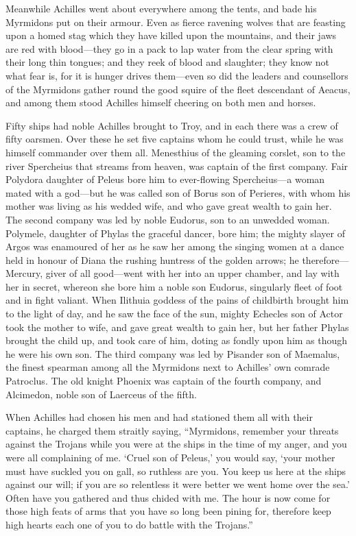 Meanwhile Achilles went about everywhere among the tents, and bade his
Myrmidons put on their armour. Even as fierce ravening wolves that are
feasting upon a homed stag which they have killed upon the mountains, and
their jaws are red with blood—they go in a pack to lap water from
the clear spring with their long thin tongues; and they reek of blood and
slaughter; they know not what fear is, for it is hunger drives them—even
so did the leaders and counsellors of the Myrmidons gather round the good
squire of the fleet descendant of Aeacus, and among them stood Achilles
himself cheering on both men and horses.

Fifty ships had noble Achilles brought to Troy, and in each there was a
crew of fifty oarsmen. Over these he set five captains whom he could
trust, while he was himself commander over them all. Menesthius of the
gleaming corslet, son to the river Spercheius that streams from heaven,
was captain of the first company. Fair Polydora daughter of Peleus bore
him to ever-flowing Spercheius—a woman mated with a god—but he
was called son of Borus son of Perieres, with whom his mother was living
as his wedded wife, and who gave great wealth to gain her. The second
company was led by noble Eudorus, son to an unwedded woman. Polymele,
daughter of Phylas the graceful dancer, bore him; the mighty slayer of
Argos was enamoured of her as he saw her among the singing women at a
dance held in honour of Diana the rushing huntress of the golden arrows;
he therefore—Mercury, giver of all good—went with her into an
upper chamber, and lay with her in secret, whereon she bore him a noble
son Eudorus, singularly fleet of foot and in fight valiant. When Ilithuia
goddess of the pains of childbirth brought him to the light of day, and
he saw the face of the sun, mighty Echecles son of Actor took the mother
to wife, and gave great wealth to gain her, but her father Phylas brought
the child up, and took care of him, doting as fondly upon him as though he
were his own son. The third company was led by Pisander son of Maemalus,
the finest spearman among all the Myrmidons next to Achilles’ own comrade
Patroclus. The old knight Phoenix was captain of the fourth company, and
Alcimedon, noble son of Laerceus of the fifth.

When Achilles had chosen his men and had stationed them all with their
captains, he charged them straitly saying, “Myrmidons, remember your
threats against the Trojans while you were at the ships in the time of my
anger, and you were all complaining of me. ‘Cruel son of Peleus,’ you
would say, ‘your mother must have suckled you on gall, so ruthless are
you. You keep us here at the ships against our will; if you are so
relentless it were better we went home over the sea.’ Often have you
gathered and thus chided with me. The hour is now come for those high
feats of arms that you have so long been pining for, therefore keep high
hearts each one of you to do battle with the Trojans.”

